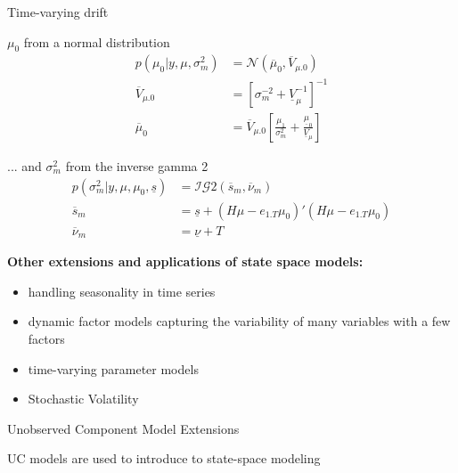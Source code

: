 \documentclass[notes,blackandwhite,mathsans,usenames,dvipsnames]{beamer}
\begin{document}
\begin{frame}{Time-varying drift}

 $\mu_0$ {\color{mcxs2}from a normal distribution}
\begin{align*}
p\left( \mu_0|y,\mu,\sigma^2_m \right) &= \mathcal{N}\left(\overline{\mu}_0,\overline{V}_{\mu.0}\right)\\[1ex]
\overline{V}_{\mu.0} &= \left[\sigma^{-2}_m  + \underline{V}_\mu^{-1} \right]^{-1}\\
\overline{\mu}_0 &= \overline{V}_{\mu.0} \left[\frac{\mu_1}{\sigma^{2}_m} + \frac{\underline{\mu}_0}{\underline{V}_\mu}  \right]
\end{align*}

{\color{mcxs2}... and} $\sigma^2_m$ {\color{mcxs2}from the inverse gamma 2}
\begin{align*}
p\left( \sigma^2_m|y,\mu,\mu_0,\underline{s} \right) &= \mathcal{IG}2\left(\overline{s}_m,\overline{\nu}_m\right)\\[1ex]
\overline{s}_m &= \underline{s} + (H\mu-e_{1.T}\mu_0)'(H\mu-e_{1.T}\mu_0)\\
\overline{\nu}_m &= \underline{\nu} + T
\end{align*}

\end{frame}




{
\begin{frame}

\bigskip\textbf{\color{mcxs1}Other extensions and applications of state space models:}
\begin{itemize}[label=$\blacktriangleright$]
\item {\color{mcxs1}handling seasonality in time series}
\item {\color{mcxs1}dynamic factor models capturing the variability of many variables with a few factors}
\item {\color{mcxs1}time-varying parameter models}
\item {\color{mcxs1}Stochastic Volatility}
\end{itemize}

\end{frame}
}



{
\begin{frame}{Unobserved Component Model Extensions}

{\color{mcxs1}UC models are used to introduce to state-space modeling}


\end{frame}
}
\end{document}

